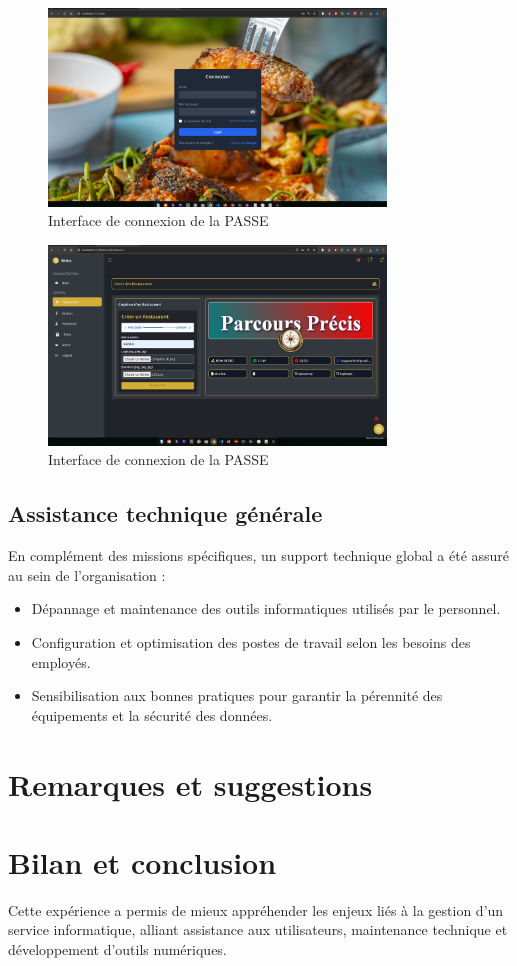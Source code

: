 \begin{figure}[H]
    \centering
    \includegraphics[width=0.8\textwidth]{images/passe/login.png}
    \caption{Interface de connexion de la \ac{PASSE}}
    \label{fig:interface-login_pass}
\end{figure}

\begin{figure}[H]
    \centering
    \includegraphics[width=0.8\textwidth]{images/passe/dash.png}
    \caption{Interface de connexion de la \ac{PASSE}}
    \label{fig:interface-login_pass}
\end{figure}








\subsection{Assistance technique générale}
En complément des missions spécifiques, un support technique global a été assuré au sein de l’organisation :
\begin{itemize}
    \item Dépannage et maintenance des outils informatiques utilisés par le personnel.
    \item Configuration et optimisation des postes de travail selon les besoins des employés.
    \item Sensibilisation aux bonnes pratiques pour garantir la pérennité des équipements et la sécurité des données.
\end{itemize}
\section{Remarques et suggestions}
\section{Bilan et conclusion}
Cette expérience a permis de mieux appréhender les enjeux liés à la gestion d’un service informatique, alliant assistance aux utilisateurs, maintenance technique et développement d’outils numériques.

\clearpage
